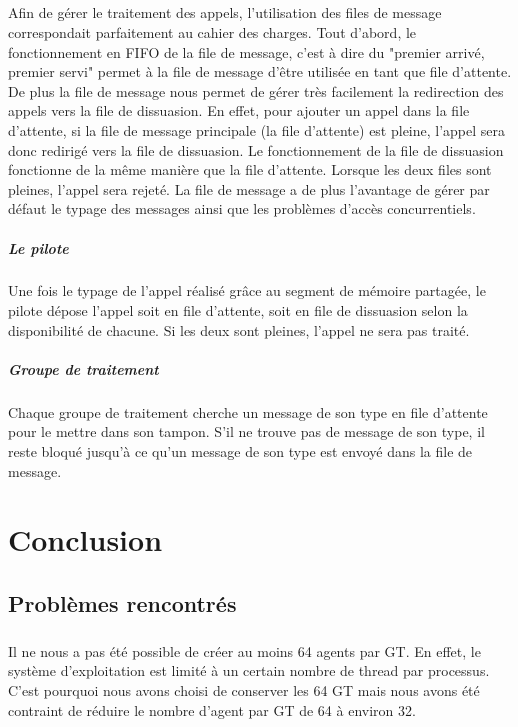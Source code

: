 \documentclass{report}
\begin{document}
		\paragraph{}
			Afin de gérer le traitement des appels, l'utilisation des files de message correspondait parfaitement au cahier des charges. Tout d'abord, le fonctionnement en FIFO de la file de message, c'est à dire du "premier arrivé, premier servi" permet à la file de message d'être utilisée en tant que file d'attente. De plus la file de message nous permet de gérer très facilement la redirection des appels vers la file de dissuasion. En effet, pour ajouter un appel dans la file d'attente, si la file de message principale (la file d'attente) est pleine, l'appel sera donc redirigé vers la file de dissuasion. Le fonctionnement de la file de dissuasion fonctionne de la même manière que la file d'attente. Lorsque les deux files sont pleines, l'appel sera rejeté. La file de message a de plus l'avantage de gérer par défaut le typage des messages ainsi que les problèmes d'accès concurrentiels.
		\paragraph{Le pilote}
			Une fois le typage de l'appel réalisé grâce au segment de mémoire partagée, le pilote dépose l'appel soit en file d'attente, soit en file de dissuasion selon la disponibilité de chacune. Si les deux sont pleines, l'appel ne sera pas traité.
		\paragraph{Groupe de traitement}
			Chaque groupe de traitement cherche un message de son type en file d'attente pour le mettre dans son tampon. S'il ne trouve pas de message de son type, il reste bloqué jusqu'à ce qu'un message de son type est envoyé dans la file de message.

\chapter{Conclusion}
	\section{Problèmes rencontrés}
		\paragraph{}
			Il ne nous a pas été possible de créer au moins 64 agents par GT. En effet, le système d'exploitation est limité à un certain nombre de thread par processus. C'est pourquoi nous avons choisi de conserver les 64 GT mais nous avons été contraint de réduire le nombre d'agent par GT de 64 à environ 32.
\end{document}
